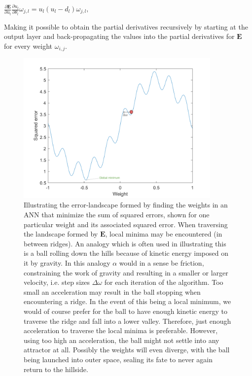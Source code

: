 \begin{center}
\begin{math}
    \frac{\partial \textbf{E}}{\partial u_l} \frac{\partial u_l}{\partial \theta_l} \omega_{j,l} = 
    u_l (u_l - d_l) \omega_{j,l},
\end{math}
\end{center}
Making it possible to obtain the partial derivatives recursively by starting at the output layer and back-propagating the values into the partial derivatives for $\textbf{E}$ for every weight $\omega_{i,j}$.

\begin{figure}
\centering
\includegraphics[width=10cm]{fig/error_landscape_with_ball.png}
\caption{Illustrating the error-landscape formed by finding the weights in an ANN that minimize the sum of squared errors, shown for one particular weight and its associated squared error. When traversing the landscape formed by $\textbf{E}$, local minima may be encountered (in between ridges). An analogy which is often used in illustrating this is a ball rolling down the hills because of kinetic energy imposed on it by gravity. In this analogy $\alpha$ would in a sense be friction, constraining the work of gravity and resulting in a smaller or larger velocity, i.e. step sizes $\Delta \omega$ for each iteration of the algorithm.
Too small an acceleration may result in the ball stopping when encountering a ridge. In the event of this being a local minimum, we would of course prefer for the ball to have enough kinetic energy to traverse the ridge and fall into a lower valley. Therefore, just enough acceleration to traverse the local minima is preferable. However, using too high an acceleration, the ball might not settle into any attractor at all. Possibly the weights will even diverge, with the ball being launched into outer space, sealing its fate to never again return to the hillside.}
\label{fig:steepest_descent}
\end{figure}

